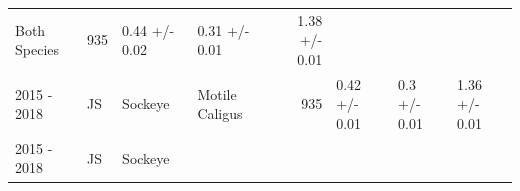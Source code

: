 \documentclass[fleqn,10pt]{wlpeerj} %
\begin{document}
\begin{longtable}[]{@{}llllrlll@{}}
\begin{minipage}[t]{0.11\columnwidth}
Both Species\strut
\end{minipage} & \begin{minipage}[t]{0.04\columnwidth}\raggedleft\strut
935\strut
\end{minipage} & \begin{minipage}[t]{0.14\columnwidth}\raggedright\strut
0.44 +/- 0.02\strut
\end{minipage} & \begin{minipage}[t]{0.14\columnwidth}\raggedright\strut
0.31 +/- 0.01\strut
\end{minipage} & \begin{minipage}[t]{0.14\columnwidth}\raggedright\strut
1.38 +/- 0.01\strut
\end{minipage}\tabularnewline
\begin{minipage}[t]{0.09\columnwidth}\raggedright\strut
2015 - 2018\strut
\end{minipage} & \begin{minipage}[t]{0.06\columnwidth}\raggedright\strut
JS\strut
\end{minipage} & \begin{minipage}[t]{0.06\columnwidth}\raggedright\strut
Sockeye\strut
\end{minipage} & \begin{minipage}[t]{0.11\columnwidth}\raggedright\strut
Motile Caligus\strut
\end{minipage} & \begin{minipage}[t]{0.04\columnwidth}\raggedleft\strut
935\strut
\end{minipage} & \begin{minipage}[t]{0.14\columnwidth}\raggedright\strut
0.42 +/- 0.01\strut
\end{minipage} & \begin{minipage}[t]{0.14\columnwidth}\raggedright\strut
0.3 +/- 0.01\strut
\end{minipage} & \begin{minipage}[t]{0.14\columnwidth}\raggedright\strut
1.36 +/- 0.01\strut
\end{minipage}\tabularnewline
\begin{minipage}[t]{0.09\columnwidth}\raggedright\strut
2015 - 2018\strut
\end{minipage} & \begin{minipage}[t]{0.06\columnwidth}\raggedright\strut
JS\strut
\end{minipage} & \begin{minipage}[t]{0.06\columnwidth}\raggedright\strut
Sockeye\strut
\end{minipage} & \begin{minipage}[t]{0.11\columnwidth}\raggedright\strut

\end{minipage}
\end{longtable}
\end{document}
